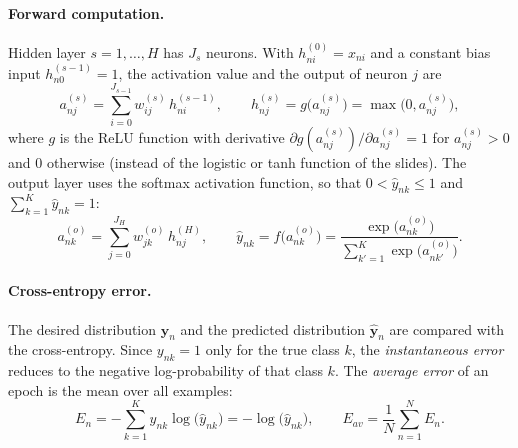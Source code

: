 \documentclass[runningheads]{llncs}
\begin{document}
\paragraph{Forward computation.} Hidden layer $s=1,\dots,H$ has $J_s$ neurons. With
$h^{(0)}_{ni}=x_{ni}$ and a constant bias input $h^{(s-1)}_{n0}=1$, the activation value and the
output of neuron $j$ are
\begin{equation}
a^{(s)}_{nj}=\sum_{i=0}^{J_{s-1}}w^{(s)}_{ij}\,h^{(s-1)}_{ni},\qquad
h^{(s)}_{nj}=g\bigl(a^{(s)}_{nj}\bigr)=\max\bigl(0,a^{(s)}_{nj}\bigr),
\end{equation}
where $g$ is the ReLU function with derivative $\partial g(a^{(s)}_{nj})/\partial a^{(s)}_{nj}=1$ for
$a^{(s)}_{nj}>0$ and $0$ otherwise (instead of the logistic or tanh function of the slides).
The output layer uses the softmax activation function, so that $0<\hat{y}_{nk}\le1$ and
$\sum_{k=1}^{K}\hat{y}_{nk}=1$:
\begin{equation}
a^{(o)}_{nk}=\sum_{j=0}^{J_H}w^{(o)}_{jk}\,h^{(H)}_{nj},\qquad
\hat{y}_{nk}=f\bigl(a^{(o)}_{nk}\bigr)=\frac{\exp\bigl(a^{(o)}_{nk}\bigr)}{\sum_{k'=1}^{K}\exp\bigl(a^{(o)}_{nk'}\bigr)} .
\end{equation}

\paragraph{Cross-entropy error.} The desired distribution $\mathbf{y}_n$ and the predicted
distribution $\hat{\mathbf{y}}_n$ are compared with the cross-entropy. Since $y_{nk}=1$ only for the
true class $k$, the \emph{instantaneous error} reduces to the negative log-probability of that class $k$.
The \emph{average error} of an epoch is the mean over all examples:
\begin{equation}
E_n=-\sum_{k=1}^{K}y_{nk}\log\bigl(\hat{y}_{nk}\bigr)=-\log\bigl(\hat{y}_{nk}\bigr),\qquad
E_{av}=\frac{1}{N}\sum_{n=1}^{N}E_n .
\end{equation}
\end{document}
